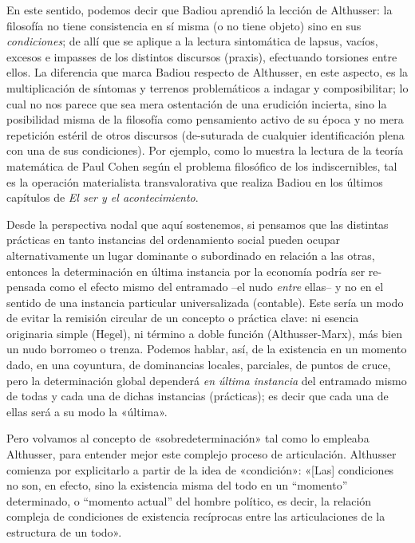 En este sentido, podemos decir que Badiou aprendió la lección de Althusser: la filosofía no tiene consistencia en sí misma (o no tiene objeto) sino en sus \emph{condiciones}; de allí que se aplique a la lectura sintomática de lapsus, vacíos, excesos e impasses de los distintos discursos (praxis), efectuando torsiones entre ellos. La diferencia que marca Badiou respecto de Althusser, en este aspecto, es la multiplicación de síntomas y terrenos problemáticos a indagar y composibilitar; lo cual no nos parece que sea mera ostentación de una erudición incierta, sino la posibilidad misma de la filosofía como pensamiento activo de su época y no mera repetición estéril de otros discursos (de-suturada de cualquier identificación plena con una de sus condiciones). Por ejemplo, como lo muestra la lectura de la teoría matemática de Paul Cohen según el problema filosófico de los indiscernibles, tal es la operación materialista transvalorativa que realiza Badiou en los últimos capítulos de \emph{El ser y el acontecimiento}.

Desde la perspectiva nodal que aquí sostenemos, si pensamos que las distintas prácticas en tanto instancias del ordenamiento social pueden ocupar alternativamente un lugar dominante o subordinado en relación a las otras, entonces la determinación en última instancia por la economía podría ser re-pensada como el efecto mismo del entramado --el nudo \emph{entre} ellas-- y no en el sentido de una instancia particular universalizada (contable). Este sería un modo de evitar la remisión circular de un concepto o práctica clave: ni esencia originaria simple (Hegel), ni término a doble función (Althusser-Marx), más bien un nudo borromeo o trenza. Podemos hablar, así, de la existencia en un momento dado, en una coyuntura, de dominancias locales, parciales, de puntos de cruce, pero la determinación global dependerá \emph{en última instancia} del entramado mismo de todas y cada una de dichas instancias (prácticas); es decir que cada una de ellas será a su modo la «última».

Pero volvamos al concepto de «sobredeterminación» tal como lo empleaba Althusser, para entender mejor este complejo proceso de articulación. Althusser comienza por explicitarlo a partir de la idea de «condición»: «{[}Las{]} condiciones no son, en efecto, sino la existencia misma del todo en un ``momento'' determinado, o ``momento actual'' del hombre político, es decir, la relación compleja de condiciones de existencia recíprocas entre las articulaciones de la estructura de un todo».

